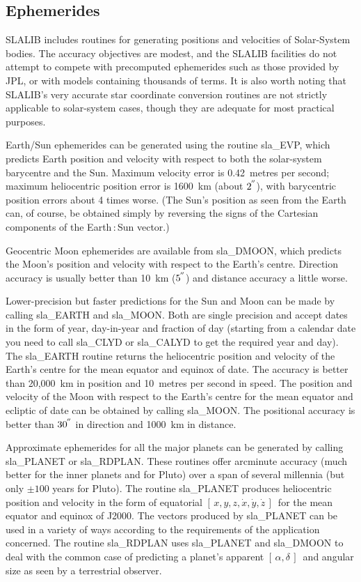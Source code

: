 \documentclass[11pt,twoside]{article}
\newcommand{\radec}     {$[\,\alpha,\delta\,]$}
\newcommand{\xyzxyzd}   {$[\,x,y,z,\dot{x},\dot{y},\dot{z}\,]$}
\newcommand{\arcseci}[1] {$#1\hspace{-0.05em}$\raisebox{-0.5ex}
                         {$^{'\hspace{-0.1em}'}$}}
\renewcommand{\arcseci}[1] {$#1\hspace{-0.05em}^{'\hspace{-0.1em}'}$}
\begin{document}
\subsection{Ephemerides}
SLALIB includes routines for generating positions and
velocities of Solar-System bodies.  The accuracy objectives are
modest, and the SLALIB facilities do not attempt
to compete with precomputed ephemerides such as
those provided by JPL, or with models containing
thousands of terms.  It is also worth noting
that SLALIB's very accurate star coordinate conversion
routines are not strictly applicable to solar-system cases,
though they are adequate for most practical purposes.

Earth/Sun ephemerides can be generated using the routine
sla\_EVP,
which predicts Earth position and velocity with respect to both the
solar-system barycentre and the
Sun.  Maximum velocity error is 0.42~metres per second;  maximum
heliocentric position error is 1600~km (about \arcseci{2}), with
barycentric position errors about 4 times worse.
(The Sun's position as
seen from the Earth can, of course, be obtained simply by
reversing the signs of the Cartesian components of the
Earth\,:\,Sun vector.)

Geocentric Moon ephemerides are available from
sla\_DMOON,
which predicts the Moon's position and velocity with respect to
the Earth's centre.  Direction accuracy is usually better than
10~km (\arcseci{5}) and distance accuracy a little worse.

Lower-precision but faster predictions for the Sun and Moon
can be made by calling
sla\_EARTH
and
sla\_MOON.
Both are single precision and accept dates in the form of
year, day-in-year and fraction of day
(starting from a calendar date you need to call
sla\_CLYD
or
sla\_CALYD
to get the required year and day).
The
sla\_EARTH
routine returns the heliocentric position and velocity
of the Earth's centre for the mean equator and
equinox of date.  The accuracy is better than 20,000~km in position
and 10~metres per second in speed.
The
position and velocity of the Moon with respect to the
Earth's centre for the mean equator and ecliptic of date
can be obtained by calling
sla\_MOON.
The positional accuracy is better than \arcseci{30} in direction
and 1000~km in distance.

Approximate ephemerides for all the major planets
can be generated by calling
sla\_PLANET
or
sla\_RDPLAN.  These routines offer arcminute accuracy (much
better for the inner planets and for Pluto) over a span of several
millennia (but only $\pm100$ years for Pluto).
The routine
sla\_PLANET produces heliocentric position and
velocity in the form of equatorial \xyzxyzd\ for the
mean equator and equinox of J2000.  The vectors
produced by
sla\_PLANET
can be used in a variety of ways according to the
requirements of the application concerned.  The routine
sla\_RDPLAN
uses
sla\_PLANET
and
sla\_DMOON
to deal with the common case of predicting
a planet's apparent \radec\ and angular size as seen by a
terrestrial observer.
\end{document}

